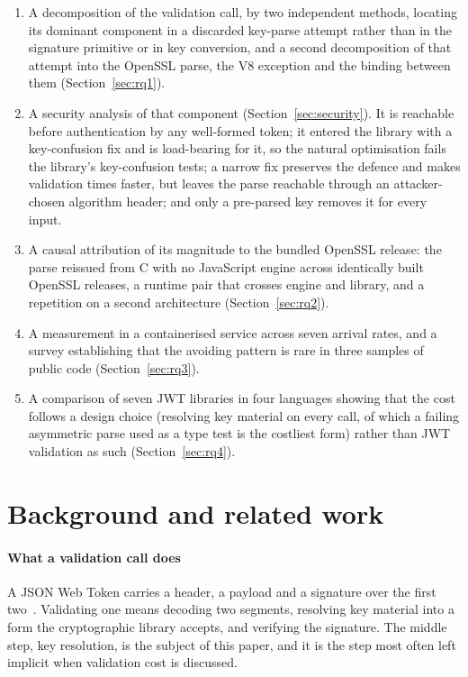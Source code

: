 \documentclass[preprint,12pt,authoryear]{elsarticle}
\begin{document}
\begin{enumerate}
\item A decomposition of the validation call, by two independent methods,
      locating its dominant component in a discarded key-parse attempt rather
      than in the signature primitive or in key conversion, and a second
      decomposition of that attempt into the OpenSSL parse, the V8 exception
      and the binding between them (Section~\ref{sec:rq1}).
\item A security analysis of that component (Section~\ref{sec:security}). It
      is reachable before authentication by any well-formed token; it entered
      the library with a key-confusion fix and is load-bearing for it, so the
      natural optimisation fails the library's key-confusion tests; a narrow
      fix preserves the defence and makes validation
      \HostSafePatchRatio{} times faster, but leaves the parse reachable
      through an attacker-chosen algorithm header; and only a pre-parsed key
      removes it for every input.
\item A causal attribution of its magnitude to the bundled OpenSSL release: the
      parse reissued from C with no JavaScript engine across
      \CProbeVersionCount{} identically built OpenSSL releases, a runtime pair
      that crosses engine and library, and a repetition on a second
      architecture (Section~\ref{sec:rq2}).
\item A measurement in a containerised service across seven arrival rates, and a survey
      establishing that the avoiding pattern is rare in three samples of public
      code (Section~\ref{sec:rq3}).
\item A comparison of seven JWT libraries in four languages showing that the
      cost follows a design choice (resolving key material on every call,
      of which a failing asymmetric parse used as a type test is the costliest
      form) rather than JWT validation as such (Section~\ref{sec:rq4}).
\end{enumerate}

\section{Background and related work}\label{sec:related}

\paragraph{What a validation call does} A JSON Web Token carries a header, a
payload and a signature over the first two~\citep{rfc7519}. Validating one means
decoding two segments, resolving key material into a form the cryptographic
library accepts, and verifying the signature. The middle step, key
resolution, is the subject of this paper, and it is the step most often left
implicit when validation cost is discussed.
\end{document}
